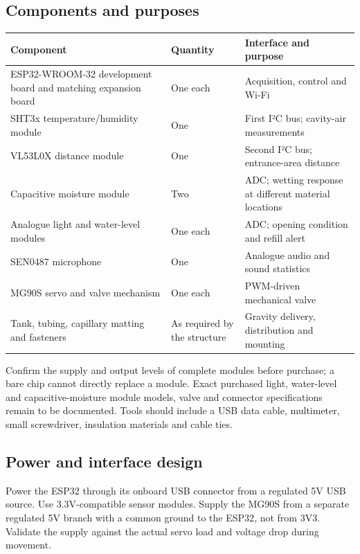 \documentclass[10pt,a4paper]{article}
\begin{document}
\subsection{Components and purposes}

\begin{longtable}{>{\raggedright\arraybackslash}p{42mm}>{\raggedright\arraybackslash}p{59mm}>{\raggedright\arraybackslash}p{58mm}}
\toprule
\textbf{Component} & \textbf{Quantity} & \textbf{Interface and purpose}\\\midrule\endhead
ESP32-WROOM-32 development board and matching expansion board & One each & Acquisition, control and Wi-Fi\\
SHT3x temperature/humidity module & One & First I²C bus; cavity-air measurements\\
VL53L0X distance module & One & Second I²C bus; entrance-area distance\\
Capacitive moisture module & Two & ADC; wetting response at different material locations\\
Analogue light and water-level modules & One each & ADC; opening condition and refill alert\\
SEN0487 microphone & One & Analogue audio and sound statistics\\
MG90S servo and valve mechanism & One each & PWM-driven mechanical valve\\
Tank, tubing, capillary matting and fasteners & As required by the structure & Gravity delivery, distribution and mounting\\
\bottomrule\end{longtable}

Confirm the supply and output levels of complete modules before purchase; a bare chip cannot directly replace a module. Exact purchased light, water-level and capacitive-moisture module models, valve and connector specifications remain to be documented. Tools should include a USB data cable, multimeter, small screwdriver, insulation materials and cable ties.


\subsection{Power and interface design}

Power the ESP32 through its onboard USB connector from a regulated 5V USB source. Use 3.3V-compatible sensor modules. Supply the MG90S from a separate regulated 5V branch with a common ground to the ESP32, not from 3V3. Validate the supply against the actual servo load and voltage drop during movement.
\end{document}
